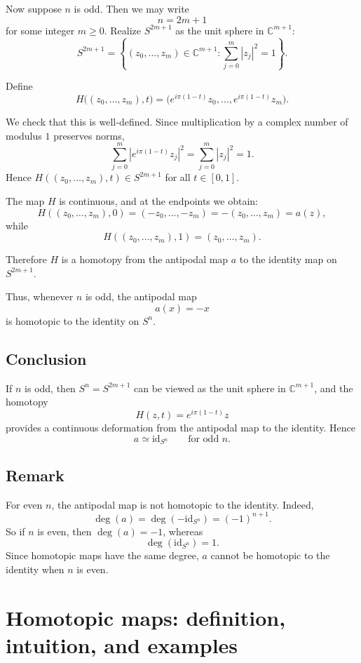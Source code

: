 \documentclass[12pt,a4paper]{article}
\theoremstyle{notespace}
\begin{document}
Now suppose \(n\) is odd. Then we may write
\[
n=2m+1
\]
for some integer \(m\ge 0\). Realize \(S^{2m+1}\) as the unit sphere in \(\mathbb C^{m+1}\):
\[
S^{2m+1}
=
\left\{
(z_0,\dots,z_m)\in \mathbb C^{m+1}
:
\sum_{j=0}^m |z_j|^2=1
\right\}.
\]

Define
\[
H\big((z_0,\dots,z_m),t\big)
=
\big(e^{i\pi(1-t)}z_0,\dots,e^{i\pi(1-t)}z_m\big).
\]

We check that this is well-defined. Since multiplication by a complex number of modulus \(1\) preserves norms,
\[
\sum_{j=0}^m \left|e^{i\pi(1-t)}z_j\right|^2
=
\sum_{j=0}^m |z_j|^2
=
1.
\]
Hence \(H((z_0,\dots,z_m),t)\in S^{2m+1}\) for all \(t\in[0,1]\).

The map \(H\) is continuous, and at the endpoints we obtain:
\[
H((z_0,\dots,z_m),0)
=
(-z_0,\dots,-z_m)
=
-(z_0,\dots,z_m)
=
a(z),
\]
while
\[
H((z_0,\dots,z_m),1)
=
(z_0,\dots,z_m).
\]

Therefore \(H\) is a homotopy from the antipodal map \(a\) to the identity map on \(S^{2m+1}\).

Thus, whenever \(n\) is odd, the antipodal map
\[
a(x)=-x
\]
is homotopic to the identity on \(S^n\).

\subsection{Conclusion}

If \(n\) is odd, then \(S^n=S^{2m+1}\) can be viewed as the unit sphere in \(\mathbb C^{m+1}\), and the homotopy
\[
H(z,t)=e^{i\pi(1-t)}z
\]
provides a continuous deformation from the antipodal map to the identity. Hence
\[
a\simeq \mathrm{id}_{S^n}
\qquad\text{for odd }n.
\]

\subsection{Remark}

For even \(n\), the antipodal map is not homotopic to the identity. Indeed,
\[
\deg(a)=\deg(-\mathrm{id}_{S^n})=(-1)^{n+1}.
\]
So if \(n\) is even, then \(\deg(a)=-1\), whereas
\[
\deg(\mathrm{id}_{S^n})=1.
\]
Since homotopic maps have the same degree, \(a\) cannot be homotopic to the identity when \(n\) is even.	
	
	
\section{Homotopic maps: definition, intuition, and examples}
\end{document}
